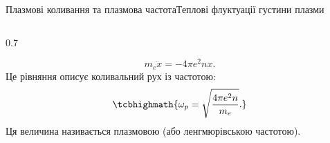 \documentclass[]{beamer}
\begin{document}
\begin{frame}{Плазмові коливання та плазмова частота}{Теплові флуктуації густини плазми}
\begin{columns}
\begin{column}{0.7\linewidth}
\begin{overprint}
\begin{block}{}
					\begin{equation*}
						m_e \ddot{x} = - 4\pi e^2 n x.
					\end{equation*}
					Це рівняння описує коливальний рух із частотою:
					\begin{equation*}
						\tcbhighmath{\omegap.}
					\end{equation*}
					Ця величина називається \alert{плазмовою} (або \alert{ленгмюрівською частотою}).
				\end{block}
			\end{overprint}
		\end{column}
	\end{columns}
\end{frame}


\end{document}
